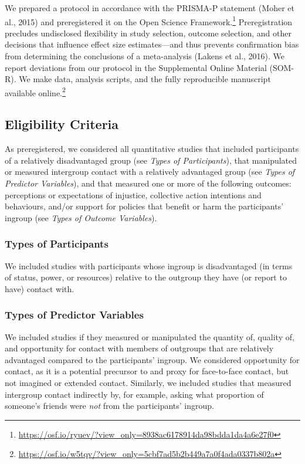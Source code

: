 \documentclass[12pt, letterpaper]{article}
\begin{document}
We prepared a protocol in accordance with the PRISMA-P statement (Moher
et al., 2015) and preregistered it on the Open Science
Framework.\footnote{\url{https://osf.io/ryuev/?view_only=8938ac6178914da98bdda1da4a6e27f0}}
Preregistration precludes undisclosed flexibility in study selection,
outcome selection, and other decisions that influence effect size
estimates---and thus prevents confirmation bias from determining the
conclusions of a meta-analysis (Lakens et al., 2016). We report
deviations from our protocol in the Supplemental Online Material
(SOM-R). We make data, analysis scripts, and the fully reproducible
manuscript available online.\footnote{\url{https://osf.io/w5tqv/?view_only=5cbf7ad5b2b449a7a0f4ada0337b802a}}

\hypertarget{eligibility-criteria}{%
\subsection{Eligibility Criteria}\label{eligibility-criteria}}

As preregistered, we considered all quantitative studies that included
participants of a relatively disadvantaged group (see \emph{Types of
Participants}), that manipulated or measured intergroup contact with a
relatively advantaged group (see \emph{Types of Predictor Variables}),
and that measured one or more of the following outcomes: perceptions or
expectations of injustice, collective action intentions and behaviours,
and/or support for policies that benefit or harm the participants'
ingroup (see \emph{Types of Outcome Variables}).

\hypertarget{types-of-participants}{%
\subsubsection{Types of Participants}\label{types-of-participants}}

We included studies with participants whose ingroup is disadvantaged (in
terms of status, power, or resources) relative to the outgroup they have
(or report to have) contact with.

\hypertarget{types-of-predictor-variables}{%
\subsubsection{Types of Predictor
Variables}\label{types-of-predictor-variables}}

We included studies if they measured or manipulated the quantity of,
quality of, and opportunity for contact with members of outgroups that
are relatively advantaged compared to the participants' ingroup. We
considered opportunity for contact, as it is a potential precursor to
and proxy for face-to-face contact, but not imagined or extended
contact. Similarly, we included studies that measured intergroup contact
indirectly by, for example, asking what proportion of someone's friends
were \emph{not} from the participants' ingroup.
\end{document}
